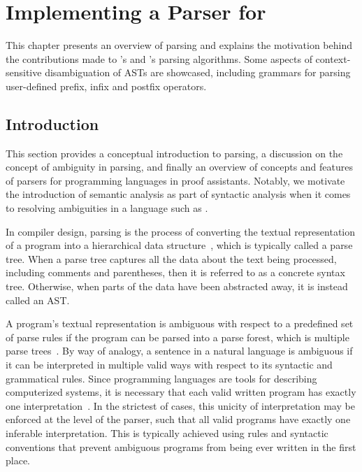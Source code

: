 \chapter{Implementing a Parser for \Beluga}

This chapter presents an overview of parsing and explains the motivation behind the contributions made to \Beluga's and \Harpoon's parsing algorithms.
Some aspects of context-sensitive disambiguation of \acp{AST} are showcased, including grammars for parsing user-defined prefix, infix and postfix operators.

\section{Introduction}\label{section:parser-introduction}

This section provides a conceptual introduction to parsing, a discussion on the concept of ambiguity in parsing, and finally an overview of concepts and features of parsers for programming languages in proof assistants.
Notably, we motivate the introduction of semantic analysis as part of syntactic analysis when it comes to resolving ambiguities in a language such as \Beluga.


In compiler design, parsing is the process of converting the textual representation of a program into a hierarchical data structure~\cite{aho2007compilers, afroozeh2019practical}, which is typically called a parse tree.
When a parse tree captures all the data about the text being processed, including comments and parentheses, then it is referred to as a concrete syntax tree.
Otherwise, when parts of the data have been abstracted away, it is instead called an \ac{AST}.


A program's textual representation is ambiguous with respect to a predefined set of parse rules if the program can be parsed into a parse forest, which is multiple parse trees~\cite{aho2007compilers}.
By way of analogy, a sentence in a natural language is ambiguous if it can be interpreted in multiple valid ways with respect to its syntactic and grammatical rules.
Since programming languages are tools for describing computerized systems, it is necessary that each valid written program has exactly one interpretation~\cite{aho2007compilers}.
In the strictest of cases, this unicity of interpretation may be enforced at the level of the parser, such that all valid programs have exactly one inferable interpretation.
This is typically achieved using rules and syntactic conventions that prevent ambiguous programs from being ever written in the first place.

